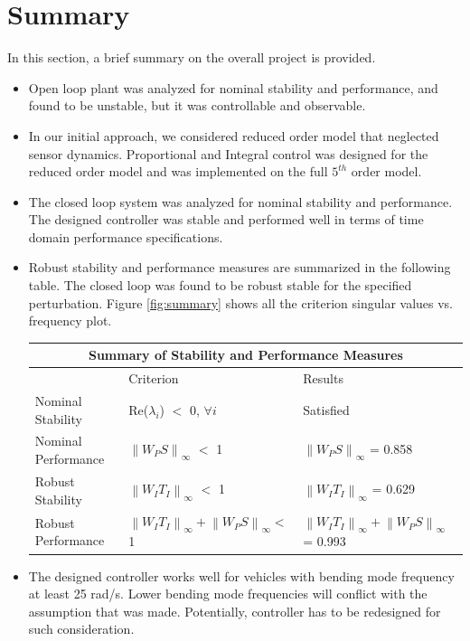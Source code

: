 \documentclass[12pt]{article}
\newcommand{\norm}[1]{\left\lVert#1\right\rVert}
\begin{document}
	\section{Summary}
	\noindent In this section, a brief summary on the overall project is provided.
	\begin{itemize}
		\item Open loop plant was analyzed for nominal stability and performance, and found to be unstable, but it was controllable and observable.
		\item In our initial approach, we considered reduced order model that neglected sensor dynamics. Proportional and Integral control was designed for the reduced order model and was implemented on the full $5^{th}$ order model. 
		\item The closed loop system was analyzed for nominal stability and performance. The designed controller was stable and performed well in terms of time domain performance specifications.
		\item Robust stability and performance measures are summarized in the following table. The closed loop was found to be robust stable for the specified perturbation. Figure \ref{fig:summary} shows all the criterion singular values vs. frequency plot.
		\begin{center}
			\begin{tabular}{ |p{4cm}|p{4.8cm}||p{5.2cm}|  }
				\hline
				\multicolumn{3}{|c|}{Summary of Stability and Performance Measures} \\
				\hline
				& Criterion & Results\\
				\hline
				Nominal Stability & Re($\lambda_i$) $<$ 0, $\forall i$  & Satisfied\\
				Nominal Performance & $\norm{W_P S}_{\infty}$ $<$ 1 & $\norm{W_P S}_{\infty}$ = 0.858\\
				Robust Stability & $\norm{W_I T_I}_{\infty}$ $<$ 1  & $\norm{W_I T_I}_{\infty}$ = 0.629\\
				Robust Performance & $\norm{W_I T_{I}}_{\infty} + \norm{W_P S}_{\infty}<$ 1 & $ \norm{W_I T_{I}}_{\infty}+ \norm{W_P S}_{\infty}$ = 0.993\\
				\hline
			\end{tabular}
		\end{center}
		
		\item The designed controller works well for vehicles with bending mode frequency at least 25 rad/s. Lower bending mode frequencies will conflict with the assumption that was made. Potentially, controller has to be redesigned for such consideration. 
		

\end{itemize}
\end{document}
